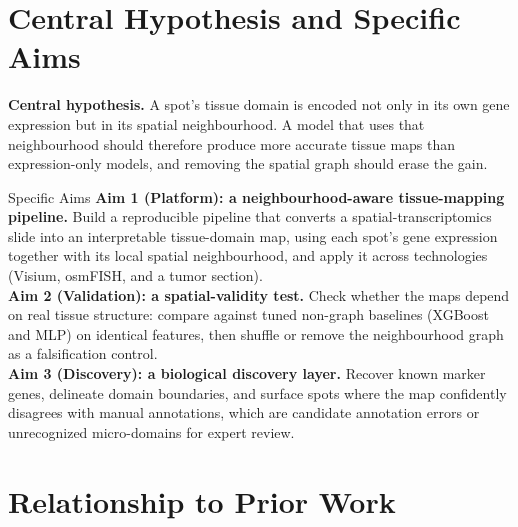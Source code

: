 \documentclass[11pt]{article}
\begin{document}
\section{Central Hypothesis and Specific Aims}

\begin{problembox}
\textbf{Central hypothesis.} A spot's tissue domain is encoded not only in its
own gene expression but in its spatial neighbourhood. A model that uses that
neighbourhood should therefore produce more accurate tissue maps than
expression-only models, and removing the spatial graph should erase the gain.
\end{problembox}

\begin{aimbox}{Specific Aims}
\textbf{Aim 1 (Platform): a neighbourhood-aware tissue-mapping pipeline.} Build a
reproducible pipeline that converts a spatial-transcriptomics slide into an
interpretable tissue-domain map, using each spot's gene expression together with
its local spatial neighbourhood, and apply it across technologies (Visium,
osmFISH, and a tumor section).\\
\textbf{Aim 2 (Validation): a spatial-validity test.} Check whether the maps
depend on real tissue structure: compare against tuned non-graph baselines
(XGBoost and MLP) on identical features, then shuffle or remove the neighbourhood
graph as a falsification control.\\
\textbf{Aim 3 (Discovery): a biological discovery layer.} Recover known marker
genes, delineate domain boundaries, and surface spots where the map confidently
disagrees with manual annotations, which are candidate annotation errors or
unrecognized micro-domains for expert review.
\end{aimbox}

\section{Relationship to Prior Work}
\end{document}
